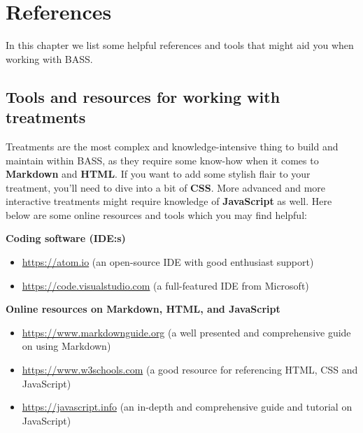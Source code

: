 \documentclass[
]{book}
\providecommand{\tightlist}{%
  \setlength{\itemsep}{0pt}\setlength{\parskip}{0pt}}
\begin{document}
\chapter{References}\label{references}

In this chapter we list some helpful references and tools that might aid you when working with BASS.

\section{Tools and resources for working with treatments}\label{tools-and-resources-for-working-with-treatments}

Treatments are the most complex and knowledge-intensive thing to build and maintain within BASS, as they require some know-how when it comes to \textbf{Markdown} and \textbf{HTML}. If you want to add some stylish flair to your treatment, you'll need to dive into a bit of \textbf{CSS}.
More advanced and more interactive treatments might require knowledge of \textbf{JavaScript} as well. Here below are some online resources and tools which you may find helpful:

\textbf{Coding software (IDE:s)}

\begin{itemize}
\tightlist
\item
  \url{https://atom.io} (an open-source IDE with good enthusiast support)
\item
  \url{https://code.visualstudio.com} (a full-featured IDE from Microsoft)
\end{itemize}

\textbf{Online resources on Markdown, HTML, and JavaScript}

\begin{itemize}
\tightlist
\item
  \url{https://www.markdownguide.org} (a well presented and comprehensive guide on using Markdown)
\item
  \url{https://www.w3schools.com} (a good resource for referencing HTML, CSS and JavaScript)
\item
  \url{https://javascript.info} (an in-depth and comprehensive guide and tutorial on JavaScript)
\end{itemize}

  
\end{document}
